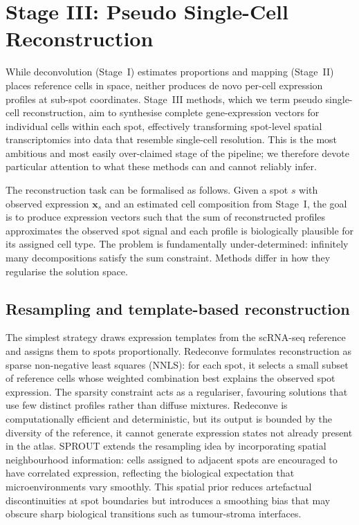 \section{Stage III: Pseudo Single-Cell Reconstruction}
\label{sec:stage3}

While deconvolution (Stage~I) estimates proportions and mapping (Stage~II) places reference cells in space, neither produces de novo per-cell expression profiles at sub-spot coordinates. Stage~III methods, which we term pseudo single-cell reconstruction, aim to synthesise complete gene-expression vectors for individual cells within each spot, effectively transforming spot-level spatial transcriptomics into data that resemble single-cell resolution. This is the most ambitious and most easily over-claimed stage of the pipeline; we therefore devote particular attention to what these methods can and cannot reliably infer.

The reconstruction task can be formalised as follows. Given a spot $s$ with observed expression $\mathbf{x}_s$ and an estimated cell composition from Stage~I, the goal is to produce expression vectors such that the sum of reconstructed profiles approximates the observed spot signal and each profile is biologically plausible for its assigned cell type. The problem is fundamentally under-determined: infinitely many decompositions satisfy the sum constraint. Methods differ in how they regularise the solution space.

\subsection{Resampling and template-based reconstruction}

The simplest strategy draws expression templates from the scRNA-seq reference and assigns them to spots proportionally. Redeconve \citep{zhang2024redeconve} formulates reconstruction as sparse non-negative least squares (NNLS): for each spot, it selects a small subset of reference cells whose weighted combination best explains the observed spot expression. The sparsity constraint acts as a regulariser, favouring solutions that use few distinct profiles rather than diffuse mixtures. Redeconve is computationally efficient and deterministic, but its output is bounded by the diversity of the reference, it cannot generate expression states not already present in the atlas. SPROUT extends the resampling idea by incorporating spatial neighbourhood information: cells assigned to adjacent spots are encouraged to have correlated expression, reflecting the biological expectation that microenvironments vary smoothly. This spatial prior reduces artefactual discontinuities at spot boundaries but introduces a smoothing bias that may obscure sharp biological transitions such as tumour-stroma interfaces.

